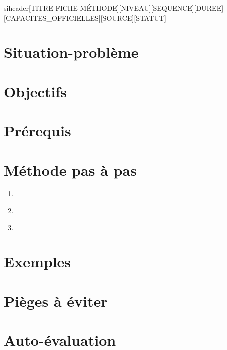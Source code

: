 \documentclass[a4paper,11pt]{article}
\begin{document}
siheader{[TITRE FICHE MÉTHODE]}{[NIVEAU]}{[SEQUENCE]}{[DUREE]}{[CAPACITES\_OFFICIELLES]}{[SOURCE]}{[STATUT]}
\section*{Situation-problème}
\section*{Objectifs}
\section*{Prérequis}
\section*{Méthode pas à pas}
\begin{enumerate}[nosep]
  \item ~
  \item ~
  \item ~
\end{enumerate}
\section*{Exemples}
\section*{Pièges à éviter}
\section*{Auto-évaluation}
\end{document}

